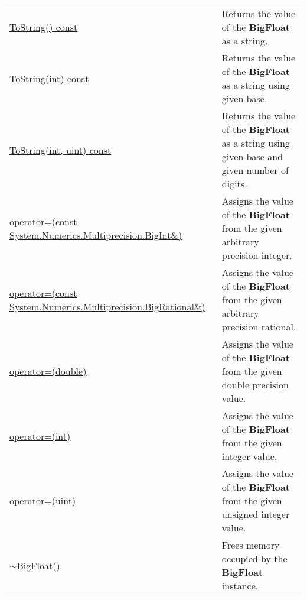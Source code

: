 \documentclass[a4paper,oneside,11.000000pt]{book}
\begin{document}
\begin{flushleft}
\begin{supertabular}[l]{!{\raggedright}p{7.575cm}!{\raggedright}p{7.575cm}}
\\
\hyperlink{System.Numerics.Multiprecision.BigFloat.ToString.C.P.System.Numerics.Multiprecision.BigFloat}{ToString() const}
& Returns the value of the \textbf{BigFloat}
 as a string.

\\
\hyperlink{System.Numerics.Multiprecision.BigFloat.ToString.C.P.System.Numerics.Multiprecision.BigFloat.int}{ToString(int) const}
& Returns the value of the \textbf{BigFloat}
 as a string using given base.

\\
\hyperlink{System.Numerics.Multiprecision.BigFloat.ToString.C.P.System.Numerics.Multiprecision.BigFloat.int.uint}{ToString(int, uint) const}
& Returns the value of the \textbf{BigFloat}
 as a string using given base and given number of digits.

\\
\hyperlink{System.Numerics.Multiprecision.BigFloat.operator.assign.P.System.Numerics.Multiprecision.BigFloat.C.R.System.Numerics.Multiprecision.BigInt}{operator=(const System.\-Numerics.\-Multiprecision.\-BigInt\&\-)}
& Assigns the value of the \textbf{BigFloat}
 from the given arbitrary precision integer.

\\
\hyperlink{System.Numerics.Multiprecision.BigFloat.operator.assign.P.System.Numerics.Multiprecision.BigFloat.C.R.System.Numerics.Multiprecision.BigRational}{operator=(const System.\-Numerics.\-Multiprecision.\-BigRational\&\-)}
& Assigns the value of the \textbf{BigFloat}
 from the given arbitrary precision rational.

\\
\hyperlink{System.Numerics.Multiprecision.BigFloat.operator.assign.P.System.Numerics.Multiprecision.BigFloat.double}{operator=(double)}
& Assigns the value of the \textbf{BigFloat}
 from the given double precision value.

\\
\hyperlink{System.Numerics.Multiprecision.BigFloat.operator.assign.P.System.Numerics.Multiprecision.BigFloat.int}{operator=(int)}
& Assigns the value of the \textbf{BigFloat}
 from the given integer value.

\\
\hyperlink{System.Numerics.Multiprecision.BigFloat.operator.assign.P.System.Numerics.Multiprecision.BigFloat.uint}{operator=(uint)}
& Assigns the value of the \textbf{BigFloat}
 from the given unsigned integer value.

\\
\hyperlink{System.Numerics.Multiprecision.BigFloat.destructor.P.System.Numerics.Multiprecision.BigFloat}{$\sim$BigFloat()}
& Frees memory occupied by the \textbf{BigFloat}
 instance.

\\
\end{supertabular}

\end{flushleft}
\clearpage
\end{document}
